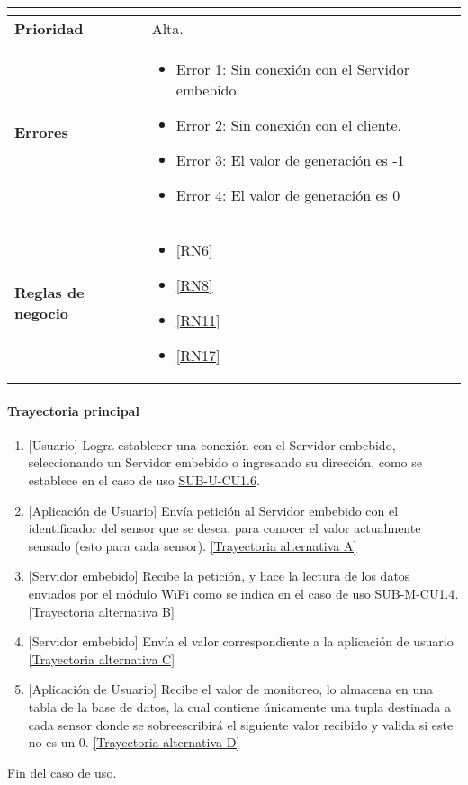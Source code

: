\begin{longtable}{|J{5cm}|J{10.3cm}|}
\begin{itemize}
		\end{itemize} \\ \hline 
	\textbf{Prioridad} & 
		Alta. \\ \hline
	\textbf{Errores} & 
		\begin{itemize}
		    \item \label{CUU1.8:Error1} Error 1: Sin conexión con el Servidor embebido.
		    \item \label{CUU1.8:Error2} Error 2: Sin conexión con el cliente.
		    \item \label{CUU1.8:Error3} Error 3: El valor de generación es -1
		    \item \label{CUU1.8:Error4} Error 4: El valor de generación es 0
		\end{itemize} \\ \hline
	\textbf{Reglas de negocio} & 
		\begin{itemize}
		    \item \ref{RN6}
			\item \ref{RN8}
			\item \ref{RN11}
			\item \ref{RN17}
		\end{itemize} \\ \hline
\end{longtable}

\paragraph{Trayectoria principal}\label{SUB-U-CU1.8:TP}
    \label{SUB-U-CU1.8:TP}
	\begin{enumerate}
	    \item {[Usuario]} Logra establecer una conexión con el Servidor embebido, seleccionando un Servidor embebido o ingresando su dirección, como se establece en el caso de uso \hyperref[SUB-U-CU1.6]{SUB-U-CU1.6}.
	    \item {[Aplicación de Usuario]} Envía petición al Servidor embebido con el identificador del sensor que se desea, para conocer el valor actualmente sensado (esto para cada sensor). \hyperref[SUB-U-CU1.8:TA]{[Trayectoria alternativa A]} 
	    \item {[Servidor embebido]} Recibe la petición, y hace la lectura de los datos enviados por el módulo WiFi como se indica en el caso de uso  \hyperref[SUB-M-CU1.4]{SUB-M-CU1.4}. \hyperref[SUB-U-CU1.8:TB]{[Trayectoria alternativa B]}
	    \item {[Servidor embebido]} Envía el valor correspondiente a la aplicación de usuario \hyperref[SUB-U-CU1.8:TC]{[Trayectoria alternativa C]} 
	    \item {[Aplicación de Usuario]} Recibe el valor de monitoreo, lo almacena en una tabla de la base de datos, la cual contiene únicamente una tupla destinada a cada sensor donde se sobreescribirá el siguiente valor recibido y valida si este no es un 0. \hyperref[SUB-U-CU1.8:TD]{[Trayectoria alternativa D]}
	\end{enumerate}
	Fin del caso de uso.


